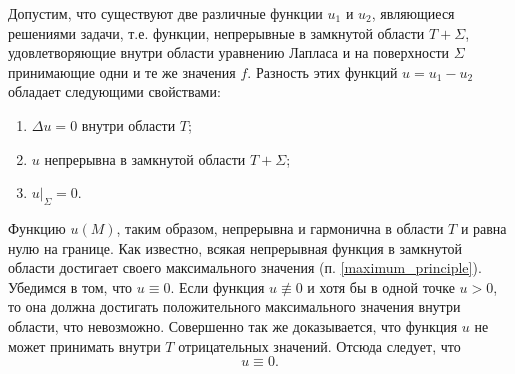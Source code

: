 Допустим, что существуют две различные функции $u_1$ и $u_2$, являющиеся решениями задачи, т.е. функции, непрерывные в замкнутой области $T + \Sigma$, удовлетворяющие внутри области уравнению Лапласа и на поверхности $\Sigma$ принимающие одни и те же значения $f$. Разность этих функций $u = u_1 - u_2$ обладает следующими свойствами:
\begin{enumerate}
	\item $\Delta u = 0$ внутри области $T$;
	
	\item $u$ непрерывна в замкнутой области $T + \Sigma$;
	
	\item $u|_{\Sigma} = 0.$
\end{enumerate}

Функцию $u(M)$, таким образом, непрерывна и гармонична в области $T$ и равна нулю на границе. Как известно, всякая непрерывная функция в замкнутой области достигает своего максимального значения (п. \ref{maximum_principle}). Убедимся в том, что $u \equiv 0$. Если функция $u \not \equiv 0$ и хотя бы в одной точке $u > 0$, то она должна достигать положительного максимального значения внутри области, что невозможно. Совершенно так же доказывается, что функция $u$ не может принимать внутри $T$ отрицательных значений. Отсюда следует, что 
\begin{equation*}
	u \equiv 0.
\end{equation*}

